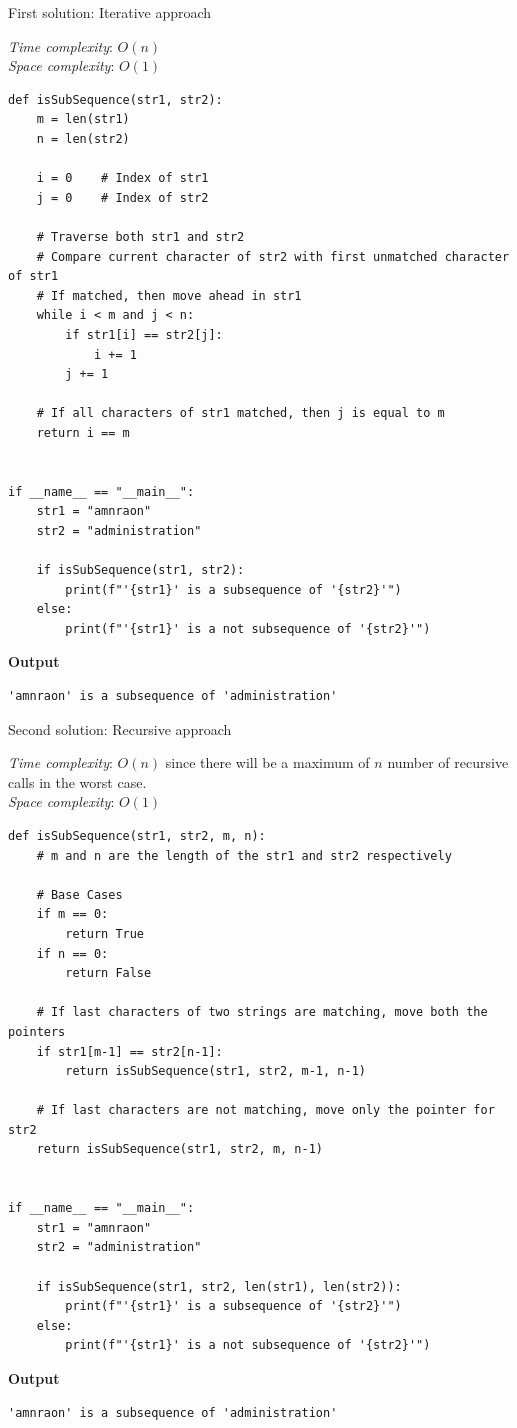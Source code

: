 \documentclass[a4paper,11pt]{book}
\begin{document}
\noindent First solution: Iterative approach
\vspace{4mm}

\noindent \textit{Time complexity}: $O(n)$\\
\noindent \textit{Space complexity}: $O(1)$\\
\begin{lstlisting}
def isSubSequence(str1, str2): 
    m = len(str1) 
    n = len(str2) 

    i = 0    # Index of str1 
    j = 0    # Index of str2 
      
    # Traverse both str1 and str2 
    # Compare current character of str2 with first unmatched character of str1 
    # If matched, then move ahead in str1 
    while i < m and j < n: 
        if str1[i] == str2[j]:     
            i += 1    
        j += 1
          
    # If all characters of str1 matched, then j is equal to m 
    return i == m 
      

if __name__ == "__main__":
    str1 = "amnraon"
    str2 = "administration"
    
    if isSubSequence(str1, str2):
        print(f"'{str1}' is a subsequence of '{str2}'") 
    else: 
        print(f"'{str1}' is a not subsequence of '{str2}'") 
\end{lstlisting}
\textbf{Output}
\begin{lstlisting}
'amnraon' is a subsequence of 'administration'
\end{lstlisting}

\noindent Second solution: Recursive approach
\vspace{4mm}

\noindent \textit{Time complexity}: $O(n)$ since there will be a maximum of $n$ number of recursive calls in the worst case.\\
\noindent \textit{Space complexity}: $O(1)$\\

\begin{lstlisting}
def isSubSequence(str1, str2, m, n):
    # m and n are the length of the str1 and str2 respectively

    # Base Cases
    if m == 0:
        return True
    if n == 0:
        return False
 
    # If last characters of two strings are matching, move both the pointers
    if str1[m-1] == str2[n-1]:
        return isSubSequence(str1, str2, m-1, n-1)
 
    # If last characters are not matching, move only the pointer for str2
    return isSubSequence(str1, str2, m, n-1)
      

if __name__ == "__main__":
    str1 = "amnraon"
    str2 = "administration"
    
    if isSubSequence(str1, str2, len(str1), len(str2)):
        print(f"'{str1}' is a subsequence of '{str2}'") 
    else: 
        print(f"'{str1}' is a not subsequence of '{str2}'") 
\end{lstlisting}
\textbf{Output}
\begin{lstlisting}
'amnraon' is a subsequence of 'administration'
\end{lstlisting}
\end{document}
